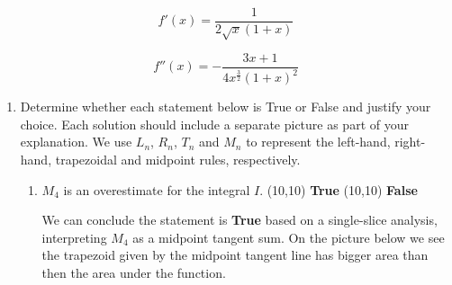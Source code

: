 \documentclass[main]{subfiles}
\begin{document}
\begin{enumerate}
\begin{minipage}{0.5\textwidth}
\begin{center}
        \vspace{-0.1in}
        
        $$f'(x) = \frac{1}{2\sqrt{x}(1+x)}$$

        $$\displaystyle f''(x) = -\frac{3x+1}{4x^{\frac32}(1+x)^2}$$
    \end{center}
\end{minipage}

\begin{enumerate}
\item Determine whether each statement below is True or False and justify your choice. Each solution should include a separate picture as part of your explanation. We use $L_n$, $R_n$, $T_n$ and $M_n$ to represent the left-hand, right-hand, trapezoidal and midpoint rules, respectively.

\begin{enumerate}
    \item 
    \begin{problem}[1.5in]
    $M_4$ is an overestimate for the integral $I$.  \qquad \framebox(10,10){\solonly{\textcolor{blue}{\checkmark}}} \textbf{ True} \hspace{0.2in} \framebox(10,10){} \textbf{ False}
    \end{problem}

    \begin{solution}
        We can conclude the statement is \textbf{True} based on a single-slice analysis, interpreting $M_4$ as a midpoint tangent sum. On the picture below we see the trapezoid given by the midpoint tangent line has bigger area than then the area under the function.

\begin{center}
\end{center}

    \end{solution}


\end{enumerate}
\end{enumerate}
\end{enumerate}
\end{document}
